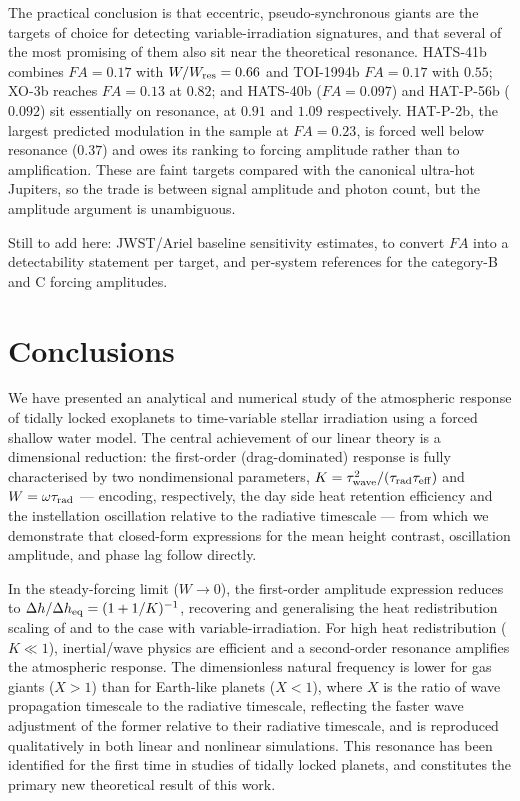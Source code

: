 \documentclass[trackchanges,twocolumn]{aastex7}
\begin{document}
The practical conclusion is that eccentric, pseudo-synchronous giants are the targets of choice for detecting variable-irradiation signatures, and that several of the most promising of them also sit near the theoretical resonance. HATS-41b combines $FA = 0.17$ with $W/W_{\rm res} = 0.66$ and TOI-1994b $FA = 0.17$ with $0.55$; XO-3b reaches $FA = 0.13$ at $0.82$; and HATS-40b ($FA = 0.097$) and HAT-P-56b ($0.092$) sit essentially on resonance, at $0.91$ and $1.09$ respectively. HAT-P-2b, the largest predicted modulation in the sample at $FA = 0.23$, is forced well below resonance ($0.37$) and owes its ranking to forcing amplitude rather than to amplification. These are faint targets compared with the canonical ultra-hot Jupiters, so the trade is between signal amplitude and photon count, but the amplitude argument is unambiguous.

{\color{teal} Still to add here: JWST/Ariel baseline sensitivity estimates, to convert $FA$ into a detectability statement per target, and per-system references for the category-B and C forcing amplitudes.}



\section{Conclusions}
\label{sec:conclusion}

We have presented an analytical and numerical study of the atmospheric response of tidally locked exoplanets to time-variable stellar irradiation using a forced shallow water model. The central achievement of our linear theory is a dimensional reduction: the first-order (drag-dominated) response is fully characterised by two nondimensional parameters, $K = \tau_{\rm wave}^2/(\tau_{\rm rad}\tau_{\rm eff})$ and $W = \omega\tau_{\rm rad}$ — encoding, respectively, the day side heat retention efficiency and the instellation oscillation relative to the radiative timescale — from which we demonstrate that closed-form expressions for the mean height contrast, oscillation amplitude, and phase lag follow directly. 

In the steady-forcing limit ($W \to 0$), the first-order amplitude expression reduces to $\Delta h/\Delta h_{\rm eq} = (1+1/K)^{-1}$, recovering and generalising the heat redistribution scaling of \citet{perez2013atmospheric} and \citet{komacek2016atmospheric} to the case with variable-irradiation. For high heat redistribution ($K \ll 1$), inertial/wave physics are efficient and a second-order resonance amplifies the atmospheric response. The dimensionless natural frequency is lower for gas giants ($X > 1$) than for Earth-like planets ($X < 1$), where $X$ is the ratio of wave propagation timescale to the radiative timescale, reflecting the faster wave adjustment of the former relative to their radiative timescale, and is reproduced qualitatively in both linear and nonlinear simulations. This resonance has been identified for the first time in studies of tidally locked planets, and constitutes the primary new theoretical result of this work.
\end{document}
